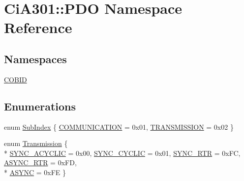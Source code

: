\hypertarget{namespace_ci_a301_1_1_p_d_o}{\section{Ci\-A301\-:\-:P\-D\-O Namespace Reference}
\label{namespace_ci_a301_1_1_p_d_o}
}
\subsection*{Namespaces}
\begin{DoxyCompactItemize}
\item 
\hyperlink{namespace_ci_a301_1_1_p_d_o_1_1_c_o_b_i_d}{C\-O\-B\-I\-D}
\end{DoxyCompactItemize}
\subsection*{Enumerations}
\begin{DoxyCompactItemize}
\item 
enum \hyperlink{namespace_ci_a301_1_1_p_d_o_a611f28b9f491e717bec59de2e853bc77}{Sub\-Index} \{ \hyperlink{namespace_ci_a301_1_1_p_d_o_a611f28b9f491e717bec59de2e853bc77a2f14df6388655cf20ed91bad641d4489}{C\-O\-M\-M\-U\-N\-I\-C\-A\-T\-I\-O\-N} = 0x01, 
\hyperlink{namespace_ci_a301_1_1_p_d_o_a611f28b9f491e717bec59de2e853bc77a4a75a6a0d260911a6bd62259770791fb}{T\-R\-A\-N\-S\-M\-I\-S\-S\-I\-O\-N} = 0x02
 \}
\item 
enum \hyperlink{namespace_ci_a301_1_1_p_d_o_a6c7a5941fe4f869dd1703fb7ce7f6549}{Transmission} \{ \\*
\hyperlink{namespace_ci_a301_1_1_p_d_o_a6c7a5941fe4f869dd1703fb7ce7f6549a6094aae3d88e3bafa764e0315b666028}{S\-Y\-N\-C\-\_\-\-A\-C\-Y\-C\-L\-I\-C} = 0x00, 
\hyperlink{namespace_ci_a301_1_1_p_d_o_a6c7a5941fe4f869dd1703fb7ce7f6549aba6ca4425aa49a7fe5fb995e25f3225f}{S\-Y\-N\-C\-\_\-\-C\-Y\-C\-L\-I\-C} = 0x01, 
\hyperlink{namespace_ci_a301_1_1_p_d_o_a6c7a5941fe4f869dd1703fb7ce7f6549a7fb8e0edb92cfb2d258019ef6aaccebc}{S\-Y\-N\-C\-\_\-\-R\-T\-R} = 0x\-F\-C, 
\hyperlink{namespace_ci_a301_1_1_p_d_o_a6c7a5941fe4f869dd1703fb7ce7f6549a39d10f2cb5ed95e2f4b1e19715d45db2}{A\-S\-Y\-N\-C\-\_\-\-R\-T\-R} = 0x\-F\-D, 
\\*
\hyperlink{namespace_ci_a301_1_1_p_d_o_a6c7a5941fe4f869dd1703fb7ce7f6549a580da8a967044c37a27716b67b8b1188}{A\-S\-Y\-N\-C} = 0x\-F\-E
 \}
\end{DoxyCompactItemize}


